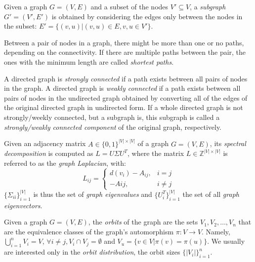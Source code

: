 \begin{definition}
Given a graph $G=(V, E)$ and a subset of the nodes $V' \subseteq V$, a \emph{subgraph} $G'=(V', E')$ is obtained by considering the edges only between the nodes in the subset: $E' = \{(v, u)|(v, u) \in E, v,u \in V'\}$.
\end{definition}

\begin{definition}
Between a pair of nodes in a graph, there might be more than one or no paths, depending on the connectivity. If there are multiple paths between the pair, the ones with the minimum length are called \emph{shortest paths}.
\end{definition}

\begin{definition}
A directed graph is \emph{strongly connected} if a path exists between all pairs of nodes in the graph. A directed graph is \emph{weakly connected} if a path exists between all pairs of nodes in the undirected graph obtained by converting all of the edges of the original directed graph in undirected form. If a whole directed graph is not strongly/weekly connected, but a subgraph is, this subgraph is called a \emph{strongly/weakly connected component} of the original graph, respectively.
\end{definition}

\begin{definition}
    Given an adjacency matrix $A \in \{0,1\}^{|V|\times|V|}$ of a graph $G=(V, E)$, its \emph{spectral decomposition} is computed as $L=U \Sigma U^T$, where the matrix $L\in\mathbb{Z}^{|V|\times|V|}$ is referred to as the \emph{graph Laplacian}, with: 
    \begin{equation}
        L_{ij}=\begin{cases}
            d(v_i)-A_{ij}, & i=j \\
            -A{ij}, & i\neq j
        \end{cases}
    \end{equation}
    $\{\Sigma_{ii}\}_{i=1}^{|V|}$ is thus the set of \emph{graph eigenvalues} and $\{U^T_{i}\}_{i=1}^{|V|}$ the set of all \emph{graph eigenvectors}.
\end{definition}

\begin{definition}
    Given a graph $G=(V,E)$, the \emph{orbits} of the graph are the sets $V_1,V_2,\dots,V_n$ that are the equivalence classes of the graph's automorphism $\pi:V \to V$. Namely, $\bigcup_{i=1}^{n}{V_i}=V$, $\forall i\neq j, V_i \cap V_j=\emptyset$ and $V_u=\{v \in V|\pi(v)=\pi(u)\}$. We usually are interested only in the \emph{orbit distribution}, the orbit sizes $\{|V_i|\}_{i=1}^{n}$.
\end{definition}

